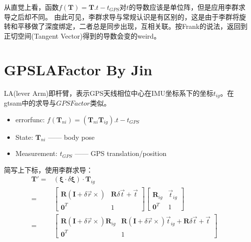 \documentclass{article}
\begin{document}
从直觉上看，函数$f(\boldsymbol{T}) = \boldsymbol{T}.t - t_{GPS}$对$t$的导数应该是单位阵，但是应用李群求导之后却不同。
由此可见，李群求导与常规认识是有区别的，这是由于李群将旋转和平移做了深度绑定，二者总是同步出现，互相关联。按Frank的说法，返回到正切空间(Tangent Vector)得到的导数会变的weird。

\section{GPSLAFactor By Jin}
LA(lever Arm)即杆臂，表示GPS天线相位中心在IMU坐标系下的坐标$t_{ig}$。在gtsam中的求导与$GPSFactor$类似。

\begin{itemize}
	\item errorfunc: $f(\boldsymbol{T}_{ni}) = (\boldsymbol{T}_{ni}\boldsymbol{T}_{ig}).t - t_{GPS}$
	\item State:  $\boldsymbol{T}_{ni}$ —— body pose 
	\item Measurement:  $t_{GPS}$ —— GPS translation/position
\end{itemize}
简写上下标，使用李群求导：
\begin{equation}
	\begin{aligned}
		\boldsymbol{T}'                          =          & (\boldsymbol{\xi} \cdot \delta \boldsymbol{\xi})\cdot\boldsymbol{T}_{ig} 
		        &   \\=                                                   & 
		\left[                                                                   
		\begin{matrix} 
		\boldsymbol{R}(\boldsymbol{I}+\delta \vec{r}\times) & \boldsymbol{R}\delta \vec{t}+\vec{t}                                     \\ 
		\boldsymbol{0}^T                                    & 1                                                                        
		\end{matrix}
		\right]
		\left[ 
		\begin{matrix} 
		\boldsymbol{R}_{ig}                                 & \vec{t}_{ig}                                                             \\ 
		\boldsymbol{0}^T                                    & 1                                                                        
		\end{matrix}
		\right] &   \\=                                                   & 
		\left[                                                                   
		\begin{matrix} 
		\boldsymbol{R}(\boldsymbol{I}+\delta \vec{r}\times)\boldsymbol{R}_{ig} & \boldsymbol{R}(\boldsymbol{I}+\delta \vec{r}\times)\vec{t}_{ig} + \boldsymbol{R}\delta \vec{t}+\vec{t}                                     \\ 
		\boldsymbol{0}^T                                    & 1                                                                        
		\end{matrix}
		\right]
	\end{aligned}
\end{equation}
\end{document}
